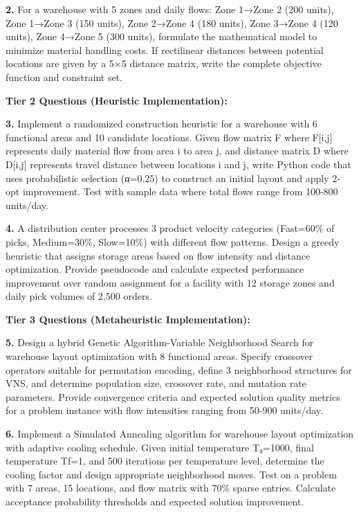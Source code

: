 \documentclass{article}
\begin{document}
\textbf{2.} For a warehouse with 5 zones and daily flows: Zone 1→Zone 2 (200 units), Zone 1→Zone 3 (150 units), Zone 2→Zone 4 (180 units), Zone 3→Zone 4 (120 units), Zone 4→Zone 5 (300 units), formulate the mathematical model to minimize material handling costs. If rectilinear distances between potential locations are given by a 5×5 distance matrix, write the complete objective function and constraint set.

\textbf{Tier 2 Questions (Heuristic Implementation):}

\textbf{3.} Implement a randomized construction heuristic for a warehouse with 6 functional areas and 10 candidate locations. Given flow matrix F where F[i,j] represents daily material flow from area i to area j, and distance matrix D where D[i,j] represents travel distance between locations i and j, write Python code that uses probabilistic selection (α=0.25) to construct an initial layout and apply 2-opt improvement. Test with sample data where total flows range from 100-800 units/day.

\textbf{4.} A distribution center processes 3 product velocity categories (Fast=60\% of picks, Medium=30\%, Slow=10\%) with different flow patterns. Design a greedy heuristic that assigns storage areas based on flow intensity and distance optimization. Provide pseudocode and calculate expected performance improvement over random assignment for a facility with 12 storage zones and daily pick volumes of 2,500 orders.

\textbf{Tier 3 Questions (Metaheuristic Implementation):}

\textbf{5.} Design a hybrid Genetic Algorithm-Variable Neighborhood Search for warehouse layout optimization with 8 functional areas. Specify crossover operators suitable for permutation encoding, define 3 neighborhood structures for VNS, and determine population size, crossover rate, and mutation rate parameters. Provide convergence criteria and expected solution quality metrics for a problem instance with flow intensities ranging from 50-900 units/day.

\textbf{6.} Implement a Simulated Annealing algorithm for warehouse layout optimization with adaptive cooling schedule. Given initial temperature T₀=1000, final temperature Tf=1, and 500 iterations per temperature level, determine the cooling factor and design appropriate neighborhood moves. Test on a problem with 7 areas, 15 locations, and flow matrix with 70\% sparse entries. Calculate acceptance probability thresholds and expected solution improvement.
\end{document}
